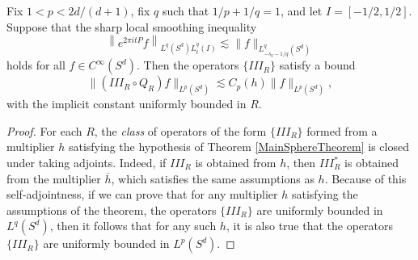 \begin{lemma} \label{LocalSmoothingLargeTimesTheorem}
    Fix $1 < p < 2d/(d+1)$, fix $q$ such that $1/p + 1/q = 1$, and let $I = [-1/2, 1/2]$. Suppose that the sharp local smoothing inequality
    \[ \left\| e^{2 \pi i t P} f \right\|_{L^q(S^d) L^q_t(I)} \lesssim \| f \|_{L^q_{-s_q-1/q}(S^d)} \]
    holds for all $f \in C^\infty(S^d)$. Then the operators $\{ III_R \}$ satisfy a bound
    \[ \| (III_R \circ Q_R) f \|_{L^p(S^d)} \lesssim C_p(h) \| f \|_{L^p(S^d)}, \]
    with the implicit constant uniformly bounded in $R$.
\end{lemma}
\begin{proof}
    For each $R$, the \emph{class} of operators of the form $\{ III_R \}$ formed from a multiplier $h$ satisfying the hypothesis of Theorem \ref{MainSphereTheorem} is closed under taking adjoints. Indeed, if $III_R$ is obtained from $h$, then $III_R^*$ is obtained from the multiplier $\overline{h}$, which satisfies the same assumptions as $h$. Because of this self-adjointness, if we can prove that for any multiplier $h$ satisfying the assumptions of the theorem, the operators $\{ III_R \}$ are uniformly bounded in $L^q(S^d)$, then it follows that for any such $h$, it is also true that the operators $\{ III_R \}$ are uniformly bounded in $L^p(S^d)$.


\end{proof}
